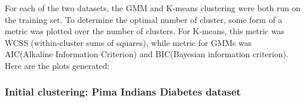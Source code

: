 \documentclass[11pt]{article}
\begin{document}




            For each of the two datasets,
            the GMM and K-means clustering were both run on the training set. To determine the optimal number
            of cluster, some form of a metric was plotted over the number of clusters. For K-means, this metric
            was WCSS (within-cluster sums of squares), while metric for GMMs was AIC(Alkaline
            Information Criterion) and BIC(Bayesian information criterion).
            Here are the plots generated:

            \subsubsection{Initial clustering: Pima Indians Diabetes dataset}
\end{document}
